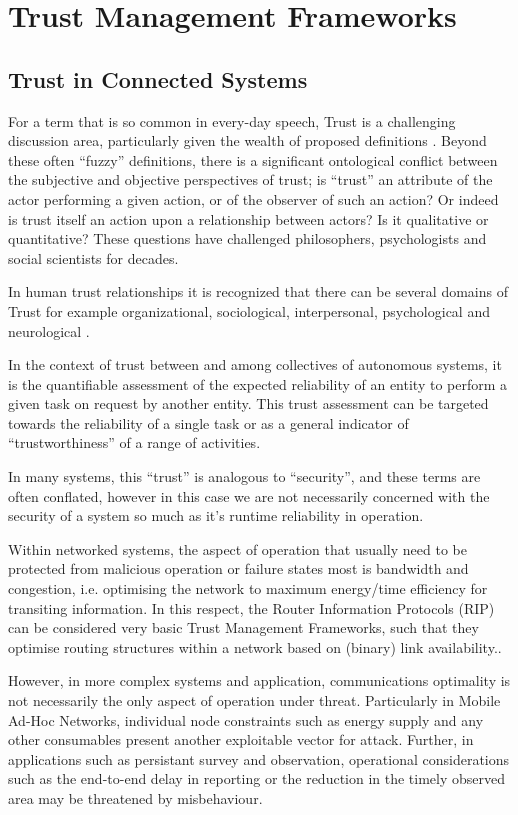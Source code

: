 \documentclass{aamas2016}
\begin{document}
\section{Trust Management Frameworks}

\subsection{Trust in Connected Systems}

For a term that is so common in every-day speech, Trust is a challenging discussion area, particularly given the wealth of proposed definitions \cite{Lee2004}. Beyond these often ``fuzzy'' definitions, there is a significant ontological conflict between the subjective and objective perspectives of trust; is ``trust'' an attribute of the actor performing a given action, or of the observer of such an action? Or indeed is trust itself an action upon a relationship between actors? Is it qualitative or quantitative? These questions have challenged philosophers, psychologists and social scientists for decades.

In human trust relationships it is recognized that there can be several domains of Trust for example organizational, sociological, interpersonal, psychological and neurological \cite{Lee2004}.

In the context of trust between and among collectives of autonomous systems, it is the quantifiable assessment of the expected reliability of an entity to perform a given task on request by another entity. This trust assessment can be targeted towards the reliability of a single task or as a general indicator of ``trustworthiness'' of a range of activities.

In many systems, this ``trust'' is analogous to ``security'', and these terms are often conflated, however in this case we are not necessarily concerned with the security of a system so much as it's runtime reliability in operation. 

Within networked systems, the aspect of operation that usually need to be protected from malicious operation or failure states most is bandwidth and congestion, i.e. optimising the network to maximum energy/time efficiency for transiting information.
In this respect, the Router Information Protocols (RIP) can be considered very basic Trust Management Frameworks, such that they optimise routing structures within a network based on (binary) link availability.\cite{RFC2453}.

However, in more complex systems and application, communications optimality is not necessarily the only aspect of operation under threat.
Particularly in Mobile Ad-Hoc Networks, individual node constraints such as energy supply and any other consumables present another exploitable vector for attack.
Further, in applications such as persistant survey and observation, operational considerations such as the end-to-end delay in reporting or the reduction in the timely observed area may be threatened by misbehaviour.
\end{document}
